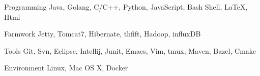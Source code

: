 

\begin{cvskills}

  \cvskill
    {Programming} %
    {Java, Golang, C/C++, Python, JavaScript, Bash Shell, LaTeX, Html} %

  \cvskill
    {Farmwork} %
    {Jetty, Tomcat7, Hibernate, thfift, Hadoop, influxDB} %

  \cvskill
    {Tools} %
    {Git, Svn, Eclipse, Intellij, Junit, Emacs, Vim, tmux, Maven, Bazel, Cmake} %

  \cvskill
    {Environment} %
    {Linux, Mac OS X, Docker} %

\end{cvskills}
